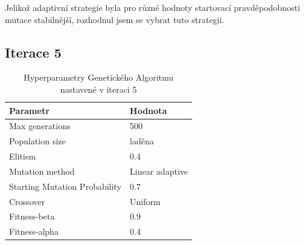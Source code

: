 \documentclass[12pt]{article}
\begin{document}


Jelikož adaptivní strategie byla pro různé hodnoty startovací pravděpodobnosti mutace stabilnější, rozhodnul jsem se vybrat tuto strategii.


\subsection{Iterace 5}

\begin{table}[h!]
\centering
\caption{Hyperparametry Genetického Algoritmu nastavené v iteraci 5}
\begin{tabular}{@{}ll@{}}
\toprule
\textbf{Parametr}        & \textbf{Hodnota}       \\ \midrule
Max generations           & 500                \\
Population size           & laděna             \\
Elitism                   & 0.4 \\
Mutation method           & Linear adaptive \\
Starting Mutation Probability      & 0.7                 \\
Crossover                 & Uniform             \\
Fitness-beta              & 0.9            \\
Fitness-alpha             & 0.4                 \\ \bottomrule
\end{tabular}
\label{tab:ga_parameters}
\end{table}
\end{document}
